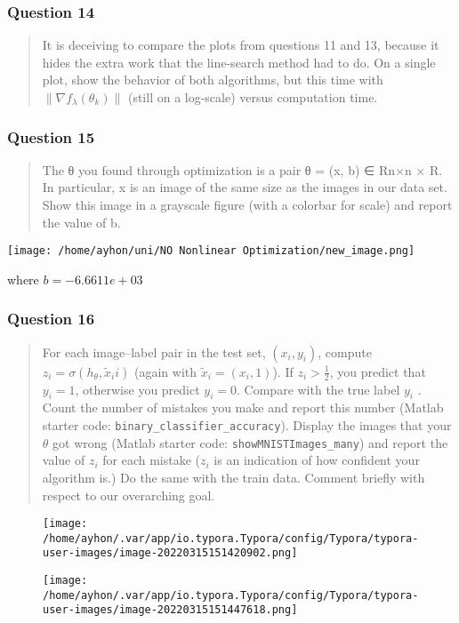 \documentclass[
]{article}
\begin{document}
\hypertarget{question-14}{%
\subsubsection{Question 14}\label{question-14}}

\begin{quote}
It is deceiving to compare the plots from questions 11 and 13, because
it hides the extra work that the line-search method had to do. On a
single plot, show the behavior of both algorithms, but this time with
\(\lVert\nabla  f_\lambda (\theta_k )\rVert\) (still on a log-scale)
versus computation time.
\end{quote}

\hypertarget{question-15}{%
\subsubsection{Question 15}\label{question-15}}

\begin{quote}
The θ you found through optimization is a pair θ = (x, b) ∈ Rn×n × R. In
particular, x is an image of the same size as the images in our data
set. Show this image in a grayscale figure (with a colorbar for scale)
and report the value of b.
\end{quote}

\texttt{[image: /home/ayhon/uni/NO Nonlinear Optimization/new\_image.png]}

where \(b = -6.6611e+03\)

\hypertarget{question-16}{%
\subsubsection{Question 16}\label{question-16}}

\begin{quote}
For each image--label pair in the test set, \((x_i, y_i)\), compute
\(z_i = \sigma(h_\theta, \tilde{x}_i i)\) (again with
\(\tilde{x}_i = (x_i , 1)\)). If \(z_i > \frac{1}{2}\), you predict that
\(y_i = 1\), otherwise you predict \(y_i = 0\). Compare with the true
label \(y_i\) . Count the number of mistakes you make and report this
number (Matlab starter code: \texttt{binary\_classifier\_accuracy}).
Display the images that your \(\theta\) got wrong (Matlab starter code:
\texttt{showMNISTImages\_many}) and report the value of \(z_i\) for each
mistake (\(z_i\) is an indication of how confident your algorithm is.)
Do the same with the train data. Comment briefly with respect to our
overarching goal.
\end{quote}

\begin{figure}
\centering
\texttt{[image: /home/ayhon/.var/app/io.typora.Typora/config/Typora/typora-user-images/image-20220315151420902.png]}
\caption{}
\end{figure}

\begin{figure}
\centering
\texttt{[image: /home/ayhon/.var/app/io.typora.Typora/config/Typora/typora-user-images/image-20220315151447618.png]}
\caption{}
\end{figure}
\end{document}

